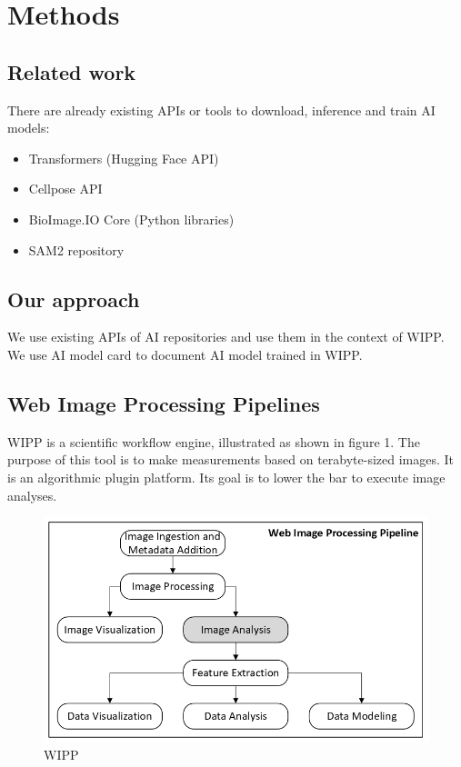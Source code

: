 \section{Methods}
\label{sec:methods}

\subsection{Related work}

There are already existing APIs or tools to download, inference and train AI
models:
\begin{itemize}
  \item Transformers (Hugging Face API) \cite{wolf-etal-2020-transformers}
  \item Cellpose API \cite{Stringer2020.02.02.931238}
  \item BioImage.IO Core (Python libraries)
  \item SAM2 repository \cite{ravi2024sam2}
\end{itemize}

\subsection{Our approach}

We use existing APIs of AI repositories and use them in the context of WIPP. We
use AI model card to document AI model trained in WIPP.

\subsection{Web Image Processing Pipelines}

WIPP is a scientific workflow engine, illustrated as shown in figure 1.
The purpose of this tool is to make measurements based on terabyte-sized images.
It is an algorithmic plugin platform. Its goal is to lower the bar to execute
image analyses.

\begin{figure}[H]
  \centering
  \includegraphics[width=1.0\linewidth]{png/1_wipp.png}
  \caption{\Gls{WIPP}}
  \label{fig:1wipp}
\end{figure}

